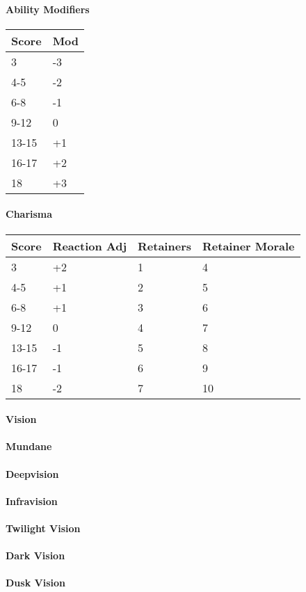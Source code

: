 \begin{multicols}{2}
\paragraph{Ability Modifiers} 
\begin{tabular}{l l}
    Score & Mod \\
    \hline
    3 & -3 \\
    4-5 & -2\\
    6-8 & -1 \\
    9-12 & 0\\
    13-15 & +1 \\
    16-17 & +2 \\
    18 & +3 \\
\end{tabular}

\paragraph{Charisma}
\begin{tabular}{l l l l}
    Score & Reaction Adj & Retainers & Retainer Morale \\
    \hline
    3 & +2 & 1 & 4\\
    4-5 & +1 & 2 & 5\\
    6-8 & +1 & 3 & 6 \\
    9-12 & 0 & 4 & 7 \\
    13-15 & -1 & 5 & 8\\
    16-17 & -1 & 6 & 9\\
    18 & -2 & 7 & 10\\
\end{tabular}
\end{multicols}
\paragraph{Vision}

\paragraph{Mundane}
\paragraph{Deepvision}
\paragraph{Infravision}
\paragraph{Twilight Vision}
\paragraph{Dark Vision}
\paragraph{Dusk Vision}
